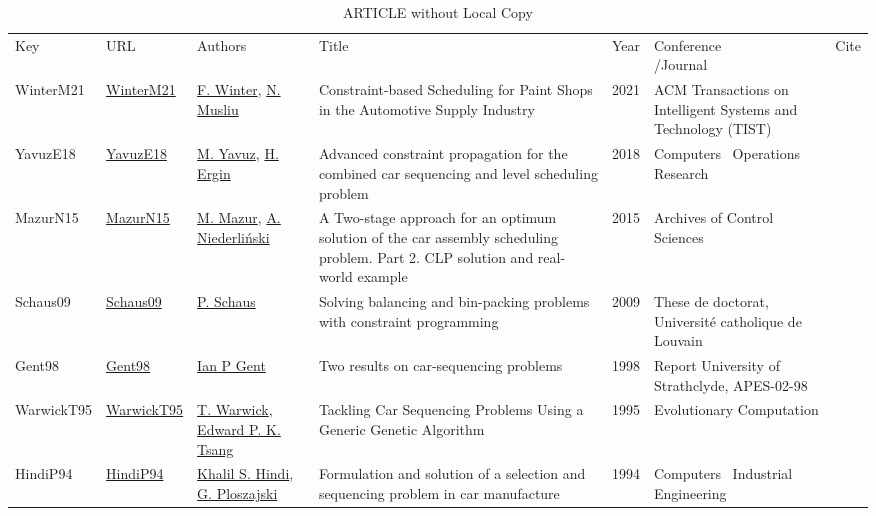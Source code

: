 {\scriptsize
\begin{longtable}{p{2cm}p{2cm}p{5cm}p{10cm}rp{3cm}l}
\rowcolor{white}\caption{ARTICLE without Local Copy}\\ \toprule
\rowcolor{white}Key & URL & Authors & Title & Year & \shortstack{Conference\\/Journal} & Cite\\ \midrule
\endhead
\bottomrule
\endfoot
WinterM21 & \href{}{WinterM21} & \hyperref[auth:a24]{F. Winter}, \hyperref[auth:a25]{N. Musliu} & Constraint-based Scheduling for Paint Shops in the Automotive Supply Industry & 2021 & ACM Transactions on Intelligent Systems and Technology (TIST) & \cite{WinterM21}\\YavuzE18 & \href{}{YavuzE18} & \hyperref[auth:a22]{M. Yavuz}, \hyperref[auth:a23]{H. Ergin} & Advanced constraint propagation for the combined car sequencing and level scheduling problem & 2018 & Computers \  Operations Research & \cite{YavuzE18}\\MazurN15 & \href{}{MazurN15} & \hyperref[auth:a31]{M. Mazur}, \hyperref[auth:a32]{A. Niederli{\'n}ski} & A Two-stage approach for an optimum solution of the car assembly scheduling problem. Part 2. CLP solution and real-world example & 2015 & Archives of Control Sciences & \cite{MazurN15}\\Schaus09 & \href{}{Schaus09} & \hyperref[auth:a19]{P. Schaus} & Solving balancing and bin-packing problems with constraint programming & 2009 & These de doctorat, Universit{\'e} catholique de Louvain & \cite{Schaus09}\\Gent98 & \href{}{Gent98} & \hyperref[auth:a18]{Ian P Gent} & Two results on car-sequencing problems & 1998 & Report University of Strathclyde, APES-02-98 & \cite{Gent98}\\WarwickT95 & \href{http://dx.doi.org/10.1162/evco.1995.3.3.267}{WarwickT95} & \hyperref[auth:a45]{T. Warwick}, \hyperref[auth:a46]{Edward P. K. Tsang} & Tackling Car Sequencing Problems Using a Generic Genetic Algorithm & 1995 & Evolutionary Computation & \cite{WarwickT95}\\HindiP94 & \href{http://dx.doi.org/10.1016/0360-8352(94)90038-8}{HindiP94} & \hyperref[auth:a37]{Khalil S. Hindi}, \hyperref[auth:a38]{G. Ploszajski} & Formulation and solution of a selection and sequencing problem in car manufacture & 1994 & Computers \  Industrial Engineering & \cite{HindiP94}\\\end{longtable}
}

